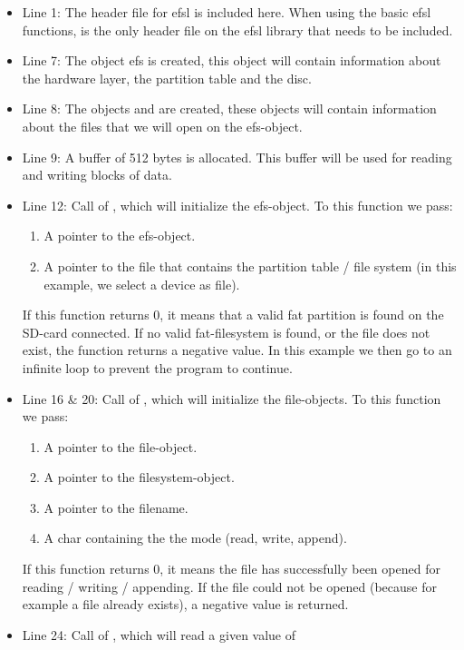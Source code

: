 \begin{itemize}
	\item{Line 1: The header file for efsl is included here. When using the
		basic efsl functions,  is the only header file on the
		efsl library that needs to be included.}
	\item{Line 7: The object efs is created, this object will contain
		information about the hardware layer, the partition table and
		the disc.}
	\item{Line 8: The objects  and  are created, these objects
		will contain information about the files that we will open on the
		efs-object.}
	\item{Line 9: A buffer of 512 bytes is allocated. This buffer will be
		used for reading and writing blocks of data.}
	\item{Line 12: Call of , which will initialize the efs-object.
		To this function we pass:
		\begin{enumerate}
			\item{A pointer to the efs-object.}
			\item{A pointer to the file that contains the partition table /
				file system (in this example, we select a device as file).}
		\end{enumerate}
		If this function returns 0, it means that a valid fat partition is
		found on the SD-card connected.
		If no valid fat-filesystem is found, or the file does not exist, the
		function returns a negative value. In this example we then go to an
		infinite loop to prevent the program to continue.}
	\item{Line 16 \& 20: Call of , which will initialize the
		file-objects. To this function we pass:
		\begin{enumerate}
			\item{A pointer to the file-object.}
			\item{A pointer to the filesystem-object.}
			\item{A pointer to the filename.}
			\item{A char containing the the mode (read, write, append).}
		\end{enumerate}
		If this function returns 0, it means the file has successfully been
		opened for reading / writing / appending.
	 	If the file could not be opened (because for example a file already
		exists), a negative value is returned.}
	\item{Line 24: Call of , which will read a given value of
}
\end{itemize}
